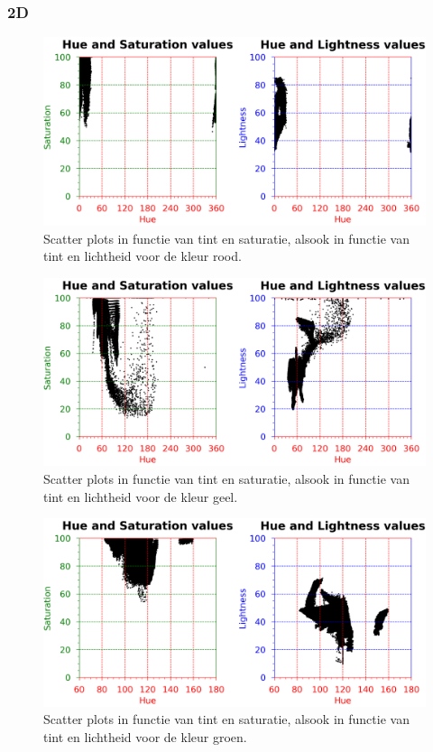 \subsubsection{2D}

\begin{figure}[h!]
	\center
	\includegraphics[width=\textwidth]{img/hslRed.png}
	\caption{Scatter plots in functie van tint en saturatie, alsook in functie van tint en lichtheid voor de kleur rood.}
	\label{hslRedPlot}
\end{figure}

\vspace{25mm}

\begin{figure}[h!]
	\center
	\includegraphics[width=\textwidth]{img/hslYellow.png}
	\caption{Scatter plots in functie van tint en saturatie, alsook in functie van tint en lichtheid voor de kleur geel.}
	\label{hslYellowPlot}
\end{figure}

\begin{figure}[h!]
	\center
	\includegraphics[width=\textwidth]{img/hslGreen.png}
	\caption{Scatter plots in functie van tint en saturatie, alsook in functie van tint en lichtheid voor de kleur groen.}
	\label{hslGreenPlot}
\end{figure}

